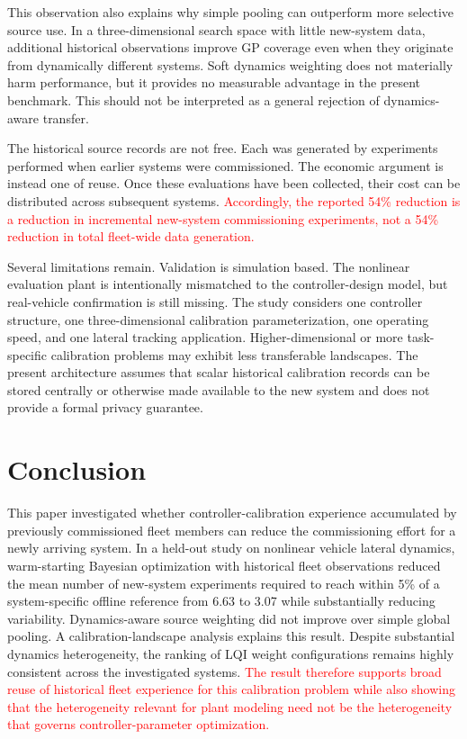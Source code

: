 \documentclass[conference]{IEEEtran}
\newcommand{\rev}[1]{\textcolor{red}{#1}}
\begin{document}
This observation also explains why simple pooling can outperform more selective source use. In a three-dimensional search space with little new-system data, additional historical observations improve GP coverage even when they originate from dynamically different systems. Soft dynamics weighting does not materially harm performance, but it provides no measurable advantage in the present benchmark. This should not be interpreted as a general rejection of dynamics-aware transfer.

The historical source records are not free. Each was generated by experiments performed when earlier systems were commissioned. The economic argument is instead one of reuse. Once these evaluations have been collected, their cost can be distributed across subsequent systems. \rev{Accordingly, the reported 54\% reduction is a reduction in incremental new-system commissioning experiments, not a 54\% reduction in total fleet-wide data generation.}

Several limitations remain. Validation is simulation based. The nonlinear evaluation plant is intentionally mismatched to the controller-design model, but real-vehicle confirmation is still missing. The study considers one controller structure, one three-dimensional calibration parameterization, one operating speed, and one lateral tracking application. Higher-dimensional or more task-specific calibration problems may exhibit less transferable landscapes. The present architecture assumes that scalar historical calibration records can be stored centrally or otherwise made available to the new system and does not provide a formal privacy guarantee.

\section{Conclusion}
This paper investigated whether controller-calibration experience accumulated by previously commissioned fleet members can reduce the commissioning effort for a newly arriving system. In a held-out study on nonlinear vehicle lateral dynamics, warm-starting Bayesian optimization with historical fleet observations reduced the mean number of new-system experiments required to reach within 5\% of a system-specific offline reference from 6.63 to 3.07 while substantially reducing variability. Dynamics-aware source weighting did not improve over simple global pooling. A calibration-landscape analysis explains this result. Despite substantial dynamics heterogeneity, the ranking of LQI weight configurations remains highly consistent across the investigated systems. \rev{The result therefore supports broad reuse of historical fleet experience for this calibration problem while also showing that the heterogeneity relevant for plant modeling need not be the heterogeneity that governs controller-parameter optimization.}



\end{document}
